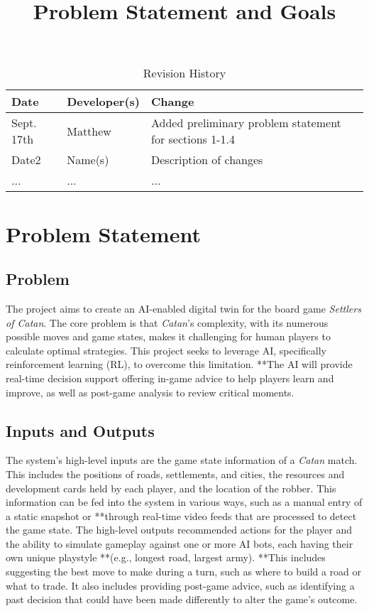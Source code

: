 \documentclass{article}
\title{Problem Statement and Goals\\\progname}
\author{\authname}
\date{}
\begin{document}
\maketitle

\begin{table}[hp]
\caption{Revision History} \label{TblRevisionHistory}
\begin{tabularx}{\textwidth}{llX}
\toprule
\textbf{Date} & \textbf{Developer(s)} & \textbf{Change}\\
\midrule
Sept. 17th & Matthew & Added preliminary problem statement for sections 1-1.4\\
Date2 & Name(s) & Description of changes\\
... & ... & ...\\
\bottomrule
\end{tabularx}
\end{table}

\section{Problem Statement}\label{sec:problem-statement}

\subsection{Problem}\label{subsec:problem}
The project aims to create an AI-enabled digital twin for the board game \emph{Settlers of Catan}.
The core problem is that \emph{Catan}'s complexity, with its numerous possible moves and game states, makes it challenging for human players to calculate optimal strategies.
This project seeks to leverage AI, specifically reinforcement learning (RL), to overcome this limitation.
**The AI will provide real-time decision support offering in-game advice to help players learn and improve, as well as post-game analysis to review critical moments.

\subsection{Inputs and Outputs}\label{subsec:inputs-and-outputs}
The system's high-level inputs are the game state information of a \emph{Catan} match.
This includes the positions of roads, settlements, and cities, the resources and development cards held by each player, and the location of the robber.
This information can be fed into the system in various ways, such as a manual entry of a static snapshot or **through real-time video feeds that are processed to detect the game state.
The high-level outputs recommended actions for the player and the ability to simulate gameplay against one or more AI bots, each having their own unique playstyle **(e.g., longest road, largest army).
**This includes suggesting the best move to make during a turn, such as where to build a road or what to trade.
It also includes providing post-game advice, such as identifying a past decision that could have been made differently to alter the game's outcome.
\end{document}
